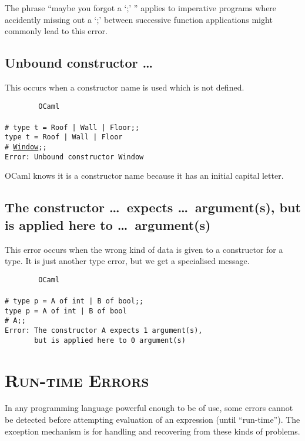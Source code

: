 \documentclass[]{book}
\newcommand{\smspace}{\vspace{4mm}}
\begin{document}
\noindent The phrase ``maybe you forgot a `;' '' applies to imperative programs where accidently missing out a `;' between successive function applications might commonly lead to this error.

\subsection*{Unbound constructor \ldots}

This occurs when a constructor name is used which is not defined.

\smspace
\noindent\verb!        OCaml!\\
\noindent\\
\texttt{\# type t = Roof | Wall | Floor;;}\\
\texttt{type t = Roof | Wall | Floor}\\
\texttt{\# \underline{Window};;}\\
\texttt{Error:\ Unbound constructor Window}
\smspace

\noindent OCaml knows it is a constructor name because it has an initial capital letter.

\subsection*{The constructor \ldots\ expects \ldots\ argument(s), but is applied here to \ldots\ argument(s)}

This error occurs when the wrong kind of data is given to a constructor for a type. It is just another type error, but we get a specialised message.

\smspace
\noindent\verb!        OCaml!\\
\noindent\\
\texttt{\# type p = A of int | B of bool;;}\\
\texttt{type p = A of int | B of bool}\\
\texttt{\# A;;}\\
\texttt{Error:\ The constructor A expects 1 argument(s),}\\
\verb!       !\texttt{but is applied here to 0 argument(s)}
\smspace

\section*{\scshape Run-time Errors}

In any programming language powerful enough to be of use, some errors cannot be detected before attempting evaluation of an expression (until ``run-time''). The exception mechanism is for handling and recovering from these kinds of problems.
\end{document}
